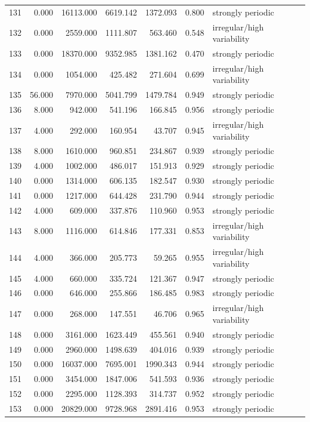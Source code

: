\begin{longtable}{lrrrrrl}
131 & 0.000 & 16113.000 & 6619.142 & 1372.093 & 0.800 & strongly periodic \\
132 & 0.000 & 2559.000 & 1111.807 & 563.460 & 0.548 & irregular/high variability \\
133 & 0.000 & 18370.000 & 9352.985 & 1381.162 & 0.470 & strongly periodic \\
134 & 0.000 & 1054.000 & 425.482 & 271.604 & 0.699 & irregular/high variability \\
135 & 56.000 & 7970.000 & 5041.799 & 1479.784 & 0.949 & strongly periodic \\
136 & 8.000 & 942.000 & 541.196 & 166.845 & 0.956 & strongly periodic \\
137 & 4.000 & 292.000 & 160.954 & 43.707 & 0.945 & irregular/high variability \\
138 & 8.000 & 1610.000 & 960.851 & 234.867 & 0.939 & strongly periodic \\
139 & 4.000 & 1002.000 & 486.017 & 151.913 & 0.929 & strongly periodic \\
140 & 0.000 & 1314.000 & 606.135 & 182.547 & 0.930 & strongly periodic \\
141 & 0.000 & 1217.000 & 644.428 & 231.790 & 0.944 & strongly periodic \\
142 & 4.000 & 609.000 & 337.876 & 110.960 & 0.953 & strongly periodic \\
143 & 8.000 & 1116.000 & 614.846 & 177.331 & 0.853 & irregular/high variability \\
144 & 4.000 & 366.000 & 205.773 & 59.265 & 0.955 & irregular/high variability \\
145 & 4.000 & 660.000 & 335.724 & 121.367 & 0.947 & strongly periodic \\
146 & 0.000 & 646.000 & 255.866 & 186.485 & 0.983 & strongly periodic \\
147 & 0.000 & 268.000 & 147.551 & 46.706 & 0.965 & irregular/high variability \\
148 & 0.000 & 3161.000 & 1623.449 & 455.561 & 0.940 & strongly periodic \\
149 & 0.000 & 2960.000 & 1498.639 & 404.016 & 0.939 & strongly periodic \\
150 & 0.000 & 16037.000 & 7695.001 & 1990.343 & 0.944 & strongly periodic \\
151 & 0.000 & 3454.000 & 1847.006 & 541.593 & 0.936 & strongly periodic \\
152 & 0.000 & 2295.000 & 1128.393 & 314.737 & 0.952 & strongly periodic \\
153 & 0.000 & 20829.000 & 9728.968 & 2891.416 & 0.953 & strongly periodic \\

\end{longtable}
